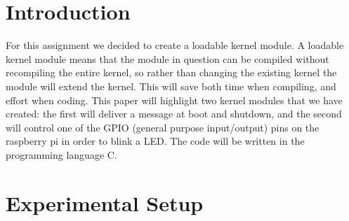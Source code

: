 \documentclass[
10pt, %
a4paper, %
oneside, %
headinclude,footinclude, %
BCOR5mm, %
]{scrartcl}
\begin{document}

\section{Introduction}

For this assignment we decided to create a loadable kernel module. A loadable kernel module means that the module in question can be compiled without recompiling the entire kernel, so rather than changing the existing kernel the module will extend the kernel. This will save both time when compiling, and effort when coding. This paper will highlight two kernel modules that we have created: the first will deliver a message at boot and shutdown, and the second will control one of the GPIO (general purpose input/output) pins on the raspberry pi in order to blink a LED. The code will be written in the programming language C.
 

\section{Experimental Setup}
\end{document}
